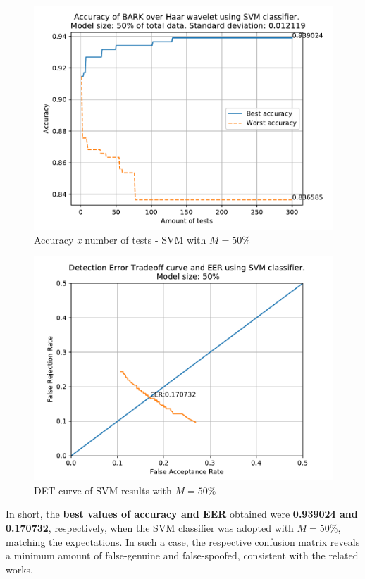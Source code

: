 	\begin{figure}[H]
		\centering
		\includegraphics[scale=.8]{images/results/confusionMatrices/classifier_SVM_50.pdf}
		\caption{Accuracy \textit{x} number of tests - SVM with $M=50\%$}
		\label{fig:classifiersvm50}
	\end{figure}
	\begin{figure}[H]
		\centering
		\includegraphics[scale=.8]{images/results/det/DET_for_classifier_SVM_50.pdf}
		\caption{DET curve of SVM results with $M=50\%$}
		\label{fig:detsvm50}
	\end{figure}

	\par In short, the \textbf{best values of accuracy and EER} obtained were \textbf{0.939024 and 0.170732}, respectively, when the SVM classifier was adopted with $M=50\%$, matching the expectations. In such a case, the respective confusion matrix reveals a minimum amount of false-genuine and false-spoofed, consistent with the related works.
	\\
	
